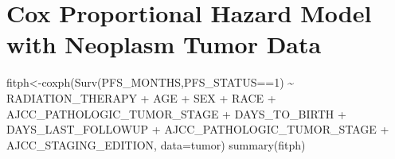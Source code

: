 \documentclass[
  11pt,
]{article}
\newenvironment{Shaded}{\begin{snugshade}}{\end{snugshade}}
\newcommand{\AttributeTok}[1]{\textcolor[rgb]{0.77,0.63,0.00}{#1}}
\newcommand{\DecValTok}[1]{\textcolor[rgb]{0.00,0.00,0.81}{#1}}
\newcommand{\FunctionTok}[1]{\textcolor[rgb]{0.00,0.00,0.00}{#1}}
\newcommand{\NormalTok}[1]{#1}
\newcommand{\OtherTok}[1]{\textcolor[rgb]{0.56,0.35,0.01}{#1}}
\newcommand{\SpecialCharTok}[1]{\textcolor[rgb]{0.00,0.00,0.00}{#1}}
\begin{document}
\newpage
\section{Cox Proportional Hazard Model with Neoplasm Tumor Data}

\begin{Shaded}
\begin{Highlighting}[]
\NormalTok{fitph}\OtherTok{\textless{}{-}}\FunctionTok{coxph}\NormalTok{(}\FunctionTok{Surv}\NormalTok{(PFS\_MONTHS,PFS\_STATUS}\SpecialCharTok{==}\DecValTok{1}\NormalTok{) }\SpecialCharTok{\textasciitilde{}}\NormalTok{ RADIATION\_THERAPY }\SpecialCharTok{+}
\NormalTok{                AGE }\SpecialCharTok{+}\NormalTok{ SEX }\SpecialCharTok{+}\NormalTok{ RACE }\SpecialCharTok{+}\NormalTok{ AJCC\_PATHOLOGIC\_TUMOR\_STAGE }\SpecialCharTok{+}\NormalTok{ DAYS\_TO\_BIRTH}
                \SpecialCharTok{+}\NormalTok{ DAYS\_LAST\_FOLLOWUP }\SpecialCharTok{+}\NormalTok{ AJCC\_PATHOLOGIC\_TUMOR\_STAGE }\SpecialCharTok{+}
\NormalTok{               AJCC\_STAGING\_EDITION, }
             \AttributeTok{data=}\NormalTok{tumor)}
\FunctionTok{summary}\NormalTok{(fitph)}
\end{Highlighting}
\end{Shaded}
\end{document}
